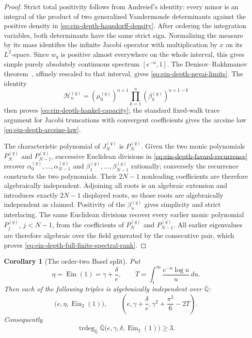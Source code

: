 \documentclass[11pt]{article}
\newtheorem{corollary}[theorem]{Corollary}
\theoremstyle{definition}
\theoremstyle{remark}
\newcommand{\Qbar}{\overline{\mathbb Q}}
\newcommand{\Ein}{\operatorname{Ein}}
\newcommand{\EinDepth}[1]{\operatorname{Ein}_{#1}}
\begin{document}
\begin{proof}
Strict total positivity follows from Andreief's identity: every minor is
an integral of the product of two generalized Vandermonde determinants
against the positive density in
\eqref{eq:ein-depth-hausdorff-density}.  After ordering the integration
variables, both determinants have the same strict sign.  Normalizing the
measure by its mass identifies the infinite Jacobi operator with
multiplication by \(x\) on its \(L^2\)-space.  Since \(w_q\) is positive
almost everywhere on the whole interval, this gives simple purely
absolutely continuous spectrum \([e^{-a},1]\).  The
Denisov--Rakhmanov theorem~\cite{Denisov2004}, affinely rescaled to that
interval, gives \eqref{eq:ein-depth-nevai-limits}.  The identity
\[
 \mathcal H_n^{(q)}
 =(\mu_0^{(q)})^{n+1}
   \prod_{k=1}^n(\beta_k^{(q)})^{n+1-k}
\]
then proves \eqref{eq:ein-depth-hankel-capacity}; the standard fixed-walk
trace argument for Jacobi truncations with convergent coefficients gives
the arcsine law \eqref{eq:ein-depth-arcsine-law}.

The characteristic polynomial of \(J_N^{(q)}\) is \(P_N^{(q)}\).  Given
the two monic polynomials \(P_N^{(q)}\) and \(P_{N-1}^{(q)}\), successive
Euclidean divisions in \eqref{eq:ein-depth-favard-recurrence} recover
\(\alpha_0^{(q)},\ldots,\alpha_{N-1}^{(q)}\) and
\(\beta_1^{(q)},\ldots,\beta_{N-1}^{(q)}\) rationally; conversely the
recurrence constructs the two polynomials.  Their \(2N-1\) nonleading
coefficients are therefore algebraically independent.  Adjoining all
roots is an algebraic extension and introduces exactly \(2N-1\) displayed
roots, so those roots are algebraically independent as claimed.  Positivity
of the \(\beta_n^{(q)}\) gives simplicity and strict interlacing.
The same Euclidean divisions recover every earlier monic polynomial
\(P_j^{(q)}\), \(j<N-1\), from the coefficients of
\(P_N^{(q)}\) and \(P_{N-1}^{(q)}\).  All earlier eigenvalues are
therefore algebraic over the field generated by the consecutive pair,
which proves \eqref{eq:ein-depth-full-finite-spectral-rank}.
\end{proof}

\begin{corollary}[The order-two Basel split]
\label{cor:ein-depth-basel}
Put
\[
 \eta=\Ein(1)=\gamma+\frac{\delta}{e},\qquad
 T=\int_1^\infty\frac{e^{-u}\log u}{u}\,du.
\]
Then each of the following triples is algebraically independent over
\(\Qbar\):
\begin{equation}\label{eq:ein-depth-basel-independent-triples}
 \bigl(e,\eta,\EinDepth{2}(1)\bigr),
 \qquad
 \left(e,\gamma+\frac{\delta}{e},
       \gamma^2+\frac{\pi^2}{6}-2T\right).
\end{equation}
Consequently
\begin{equation}\label{eq:ein-depth-gamma-delta-lower-bound}
 \operatorname{trdeg}_{\Qbar}
 \Qbar\bigl(e,\gamma,\delta,\EinDepth{2}(1)\bigr)\geq3.
\end{equation}
\end{corollary}
\end{document}
